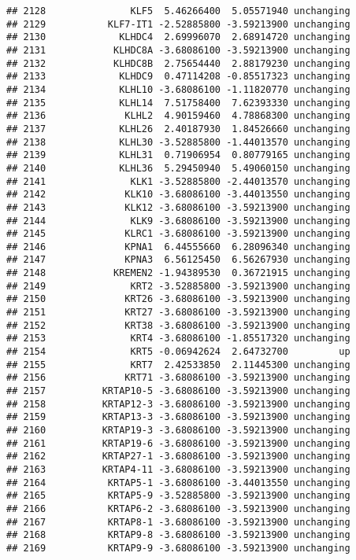 \documentclass[]{article}
\begin{document}
\begin{verbatim}
## 2128               KLF5  5.46266400  5.05571940 unchanging
## 2129           KLF7-IT1 -2.52885800 -3.59213900 unchanging
## 2130             KLHDC4  2.69996070  2.68914720 unchanging
## 2131            KLHDC8A -3.68086100 -3.59213900 unchanging
## 2132            KLHDC8B  2.75654440  2.88179230 unchanging
## 2133             KLHDC9  0.47114208 -0.85517323 unchanging
## 2134             KLHL10 -3.68086100 -1.11820770 unchanging
## 2135             KLHL14  7.51758400  7.62393330 unchanging
## 2136              KLHL2  4.90159460  4.78868300 unchanging
## 2137             KLHL26  2.40187930  1.84526660 unchanging
## 2138             KLHL30 -3.52885800 -1.44013570 unchanging
## 2139             KLHL31  0.71906954  0.80779165 unchanging
## 2140             KLHL36  5.29450940  5.49060150 unchanging
## 2141               KLK1 -3.52885800 -2.44013570 unchanging
## 2142              KLK10 -3.68086100 -3.44013550 unchanging
## 2143              KLK12 -3.68086100 -3.59213900 unchanging
## 2144               KLK9 -3.68086100 -3.59213900 unchanging
## 2145              KLRC1 -3.68086100 -3.59213900 unchanging
## 2146              KPNA1  6.44555660  6.28096340 unchanging
## 2147              KPNA3  6.56125450  6.56267930 unchanging
## 2148            KREMEN2 -1.94389530  0.36721915 unchanging
## 2149               KRT2 -3.52885800 -3.59213900 unchanging
## 2150              KRT26 -3.68086100 -3.59213900 unchanging
## 2151              KRT27 -3.68086100 -3.59213900 unchanging
## 2152              KRT38 -3.68086100 -3.59213900 unchanging
## 2153               KRT4 -3.68086100 -1.85517320 unchanging
## 2154               KRT5 -0.06942624  2.64732700         up
## 2155               KRT7  2.42533850  2.11445300 unchanging
## 2156              KRT71 -3.68086100 -3.59213900 unchanging
## 2157          KRTAP10-5 -3.68086100 -3.59213900 unchanging
## 2158          KRTAP12-3 -3.68086100 -3.59213900 unchanging
## 2159          KRTAP13-3 -3.68086100 -3.59213900 unchanging
## 2160          KRTAP19-3 -3.68086100 -3.59213900 unchanging
## 2161          KRTAP19-6 -3.68086100 -3.59213900 unchanging
## 2162          KRTAP27-1 -3.68086100 -3.59213900 unchanging
## 2163          KRTAP4-11 -3.68086100 -3.59213900 unchanging
## 2164           KRTAP5-1 -3.68086100 -3.44013550 unchanging
## 2165           KRTAP5-9 -3.52885800 -3.59213900 unchanging
## 2166           KRTAP6-2 -3.68086100 -3.59213900 unchanging
## 2167           KRTAP8-1 -3.68086100 -3.59213900 unchanging
## 2168           KRTAP9-8 -3.68086100 -3.59213900 unchanging
## 2169           KRTAP9-9 -3.68086100 -3.59213900 unchanging

\end{verbatim}
\end{document}
